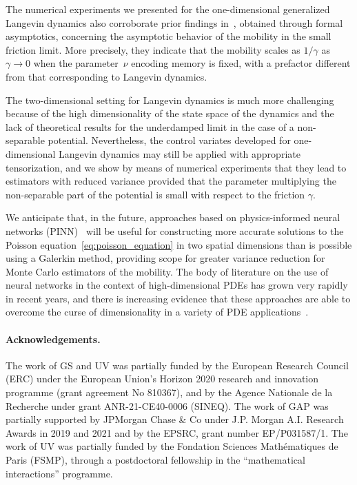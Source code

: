 \documentclass[11pt,a4paper]{article}
\begin{document}
The numerical experiments we presented for the one-dimensional generalized Langevin dynamics also corroborate prior findings in~\cite{GPGSUV21},
obtained through formal asymptotics,
concerning the asymptotic behavior of the mobility in the small friction limit.
More precisely, they indicate that the mobility scales as $1/\gamma$ as $\gamma \to 0$ when the parameter~$\nu$ encoding memory is fixed,
with a prefactor different from that corresponding to Langevin dynamics.

The two-dimensional setting for Langevin dynamics is much more challenging because of the high dimensionality of the state space of the dynamics
and the lack of theoretical results for the underdamped limit in the case of a non-separable potential.
Nevertheless, the control variates developed for one-dimensional Langevin dynamics may still be applied with appropriate tensorization,
and we show by means of numerical experiments that
they lead to estimators with reduced variance provided that
the parameter multiplying the non-separable part of the potential is small with respect to the friction $\gamma$.

We anticipate that, in the future,
approaches based on physics-informed neural networks (PINN)~\cite{MR3759415,MR3881695} will be useful for constructing more accurate solutions to the Poisson equation~\eqref{eq:poisson_equation} in two spatial dimensions than is possible using a Galerkin method,
providing scope for greater variance reduction for Monte Carlo estimators of the mobility.
The body of literature on the use of neural networks in the context of high-dimensional PDEs has grown very rapidly in recent years,
and there is increasing evidence that these approaches are able to overcome the curse of dimensionality in a variety of PDE applications~\cite{MR3847747,MR4338293,2018arXiv180907321J,2019arXiv190810828G,2019arXiv190110854H,2021arXiv210614473D,MR4203091,pmlr-v145-zhai22a}.

\paragraph{Acknowledgements.}
The work of GS and UV was partially funded by the European Research Council (ERC) under the European Union's Horizon 2020 research and innovation programme (grant agreement No 810367),
and by the Agence Nationale de la Recherche under grant ANR-21-CE40-0006 (SINEQ).
The work of GAP was partially supported by JPMorgan Chase \& Co under J.P. Morgan A.I. Research Awards in 2019 and 2021 and by the EPSRC, grant number EP/P031587/1.
The work of UV was partially funded by the Fondation Sciences Mathématiques de Paris (FSMP),
through a postdoctoral fellowship in the ``mathematical interactions'' programme.
\end{document}
